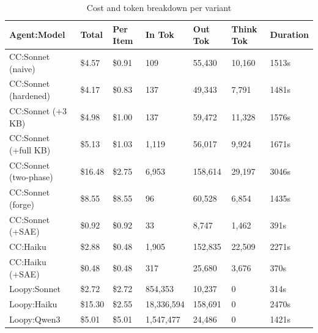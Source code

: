 \begin{table}[t]
\centering
\caption{Cost and token breakdown per variant}
\label{tab:cost-analysis}
\small
\begin{tabular}{lllllll}
\toprule
 Agent:Model           & Total   & Per Item   & In Tok     & Out Tok   & Think Tok   & Duration   \\
\midrule
 CC:Sonnet (naive)     & \$4.57  & \$0.91     & 109        & 55,430    & 10,160      & 1513s      \\
 CC:Sonnet (hardened)  & \$4.17  & \$0.83     & 137        & 49,343    & 7,791       & 1481s      \\
 CC:Sonnet (+3 KB)     & \$4.98  & \$1.00     & 137        & 59,472    & 11,328      & 1576s      \\
 CC:Sonnet (+full KB)  & \$5.13  & \$1.03     & 1,119      & 56,017    & 9,924       & 1671s      \\
 CC:Sonnet (two-phase) & \$16.48 & \$2.75     & 6,953      & 158,614   & 29,197      & 3046s      \\
 CC:Sonnet (forge)     & \$8.55  & \$8.55     & 96         & 60,528    & 6,854       & 1435s      \\
 CC:Sonnet (+SAE)      & \$0.92  & \$0.92     & 33         & 8,747     & 1,462       & 391s       \\
 CC:Haiku              & \$2.88  & \$0.48     & 1,905      & 152,835   & 22,509      & 2271s      \\
 CC:Haiku (+SAE)       & \$0.48  & \$0.48     & 317        & 25,680    & 3,676       & 370s       \\
 Loopy:Sonnet          & \$2.72  & \$2.72     & 854,353    & 10,237    & 0           & 314s       \\
 Loopy:Haiku           & \$15.30 & \$2.55     & 18,336,594 & 158,691   & 0           & 2470s      \\
 Loopy:Qwen3           & \$5.01  & \$5.01     & 1,547,477  & 24,486    & 0           & 1421s      \\
\bottomrule
\end{tabular}
\end{table}
